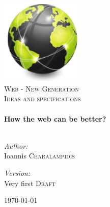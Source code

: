 \begin{titlepage}

\begin{center}
\includegraphics[width=0.30\textwidth]{images/Network-Web-icon.png}\\[1cm]    

\textsc{\LARGE Web - New Generation}\\[1.5cm]

\textsc{\Large Ideas and specifications}\\[0.5cm]


\HRule \\[0.4cm]
{ \huge \bfseries How the web can be better?}\\[0.4cm]

\HRule \\[1.5cm]

\begin{minipage}{0.4\textwidth}
\begin{flushleft} \large
\emph{Author:}\\
Ioannis \textsc{Charalampidis}
\end{flushleft}
\end{minipage}
\begin{minipage}{0.4\textwidth}
\begin{flushright} \large
\emph{Version:} \\
Very first \textsc{Draft}
\end{flushright}
\end{minipage}

\vfill

{\large \today}

\end{center}
\end{titlepage}